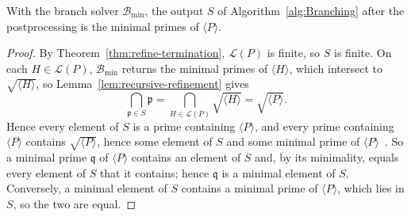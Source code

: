 \begin{theorem}
  \label{thm:prime-branching}
  With the branch solver $\mathcal B_{\min}$, the output $S$ of
  Algorithm~\ref{alg:Branching} after the postprocessing is the minimal primes
  of $\langle P\rangle$.
\end{theorem}

\begin{proof}
  By Theorem~\ref{thm:refine-termination}, $\mathcal L(P)$ is finite, so
  $S$ is finite. On each $H\in\mathcal L(P)$, $\mathcal B_{\min}$
  returns the minimal primes of $\langle H\rangle$, which intersect to
  $\sqrt{\langle H\rangle}$, so Lemma~\ref{lem:recursive-refinement} gives
  \[
    \bigcap_{\mathfrak p\in S}\mathfrak p
    =\bigcap_{H\in\mathcal L(P)}\sqrt{\langle H\rangle}
    =\sqrt{\langle P\rangle}.
  \]
  Hence every element of $S$ is a prime containing $\langle P\rangle$, and
  every prime containing $\langle P\rangle$ contains
  $\sqrt{\langle P\rangle}$, hence some element of $S$ and some minimal prime
  of $\langle P\rangle$~\cite[Prop.~1.11]{atiyah1969introduction}. So a
  minimal prime $\mathfrak q$ of $\langle P\rangle$ contains an element of $S$
  and, by its minimality, equals every element of $S$ that it contains; hence
  $\mathfrak q$ is a minimal element of $S$. Conversely, a minimal element of
  $S$ contains a minimal prime of $\langle P\rangle$, which lies in $S$, so the
  two are equal.
\end{proof}
